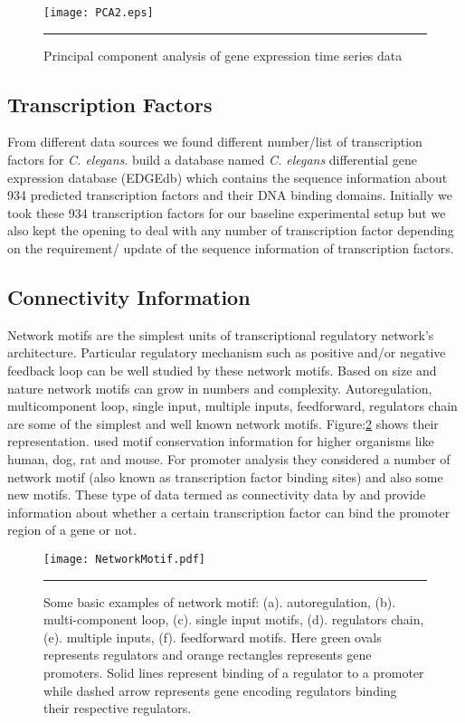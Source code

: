 \begin{figure}
	\centering
		\texttt{[image: PCA2.eps]}
		\rule{35em}{0.5pt}
	\caption[Principal component analysis of time series data ]
		{Principal component analysis of gene expression time series data}
	\label{fig:PCA_time_series}
\end{figure}

\subsection{Transcription Factors}
From different data sources we found different number/list of transcription factors for \textit{C. elegans}. \cite{Inmaculada:2007} build a database named \textit{C. elegans} differential gene expression database (EDGEdb) which contains the sequence information about 934 predicted transcription factors and their DNA binding domains. Initially we took these 934 transcription factors for our baseline experimental setup but we also kept the opening to deal with any number of transcription factor depending on the requirement/ update of the sequence information of transcription factors.

\subsection{Connectivity Information}
Network motifs are the simplest units of transcriptional regulatory network's architecture. Particular regulatory mechanism such as positive and/or negative feedback loop can be well studied by these network motifs. Based on size and nature network motifs can grow in numbers and complexity. Autoregulation, multicomponent loop, single input, multiple inputs, feedforward, regulators chain are some of the simplest and well known network motifs. Figure:\ref{fig:networkMotif} shows their representation. \cite{Xie:2005} used motif conservation information for higher organisms like human, dog, rat and mouse. For promoter analysis they considered a number of network motif (also known as transcription factor binding sites) and also some new motifs. These type of data termed as connectivity data by \cite{Liao:2003} and provide information about whether a certain transcription factor can bind the promoter region of a gene or not.

\begin{figure}
	\centering
		\texttt{[image: NetworkMotif.pdf]}
		\rule{35em}{0.5pt}
	\caption[Basic examples of network motif]
		{Some basic examples of network motif: (a). autoregulation, (b). multi-component loop, (c). single input motifs, (d). regulators chain, (e). multiple inputs, (f). feedforward motifs. Here green ovals represents regulators and orange rectangles represents gene promoters. Solid lines represent binding of a regulator to a promoter while dashed arrow represents gene encoding regulators binding their respective regulators.}
	\label{fig:networkMotif}
\end{figure}

